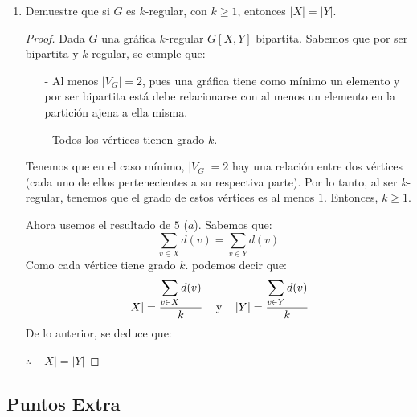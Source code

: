 \documentclass{article}
\begin{document}
\begin{enumerate}
\begin{enumerate}
\begin{proof}
    Por lo tanto para toda g tenemos que  $\sum_{v \in X}d(v) = \sum_{v \in Y}d(v) $ 
    \end{proof}
    
  \item Demuestre que si $G$ es $k$-regular, con $k \ge 1$, entonces
    $|X| = |Y|$.
    \begin{proof}
      Dada $G$ una gráfica $k$-regular $G[X,Y]$ bipartita. 
      Sabemos que por ser bipartita y $k$-regular, se cumple que:
      \begin{itemize}
      \item[-] Al menos $|V_G|=2$, pues una gráfica tiene como mínimo
        un elemento y por ser bipartita está debe relacionarse con al
        menos un elemento en la partición ajena a ella misma. 
        
      \item[-] Todos los vértices tienen grado $k$.
      \end{itemize}
      Tenemos que en el caso mínimo, $|V_G| = 2$  hay una relación entre
      dos vértices (cada uno de ellos pertenecientes a su respectiva
      parte). Por lo tanto, al ser $k$-regular, tenemos que el grado
      de estos vértices es al menos $1$. Entonces, $k \geq 1$.
      
      Ahora usemos el resultado de $5$ ($a$). Sabemos que:
      \[
      \sum_{v \in X} d(v) = \sum_{v \in Y} d(v)
      \]
      Como cada vértice tiene grado $k$. podemos decir que:
      \[
      \abs{X} = \frac{\displaystyle \sum_{v \in X} d(v)}{k} \text{\hspace{0.3cm}
        y \hspace{0.3cm}} \abs{Y} = \frac{\displaystyle \sum_{v \in Y} d(v)}{k}
      \]
      De lo anterior, se deduce que:

      \hspace*{5.6cm} $\therefore\ \ \ \ |X| = |Y|$
    \end{proof}
  \end{enumerate}
  
\end{enumerate}

\subsection*{Puntos Extra}
\end{document}
